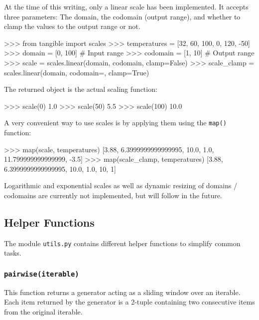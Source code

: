 At the time of this writing, only a linear scale has been implemented. It
accepts three parameters: The domain, the codomain (output range), and whether
to clamp the values to the output range or not.

\vspace{.5\baselineskip}
\begin{pythoncode}
>>> from tangible import scales
>>> temperatures = [32, 60, 100, 0, 120, -50]
>>> domain = [0, 100]  # Input range
>>> codomain = [1, 10]  # Output range
>>> scale = scales.linear(domain, codomain, clamp=False)
>>> scale_clamp = scales.linear(domain, codomain=, clamp=True)
\end{pythoncode}

\noindent The returned object is the actual scaling function:

\vspace{.5\baselineskip}
\begin{pythoncode}
>>> scale(0)
1.0
>>> scale(50)
5.5
>>> scale(100)
10.0
\end{pythoncode}

\noindent A very convenient way to use scales is by applying them using the
\texttt{map()} function:

\vspace{.5\baselineskip}
\begin{pythoncode}
>>> map(scale, temperatures)
[3.88, 6.3999999999999995, 10.0, 1.0, 11.799999999999999, -3.5]
>>> map(scale_clamp, temperatures)
[3.88, 6.3999999999999995, 10.0, 1.0, 10, 1]
\end{pythoncode}

\noindent Logarithmic and exponential scales as well as dynamic resizing of
domains / codomains are currently not implemented, but will follow in the
future.

\subsection{Helper Functions}

The module \texttt{utils.py} contains different helper functions to simplify
common tasks.


\subsubsection{\texttt{pairwise(iterable)}}

\noindent This function returns a generator acting as a sliding window over an iterable.
Each item returned by the generator is a 2-tuple containing two consecutive
items from the original iterable.

